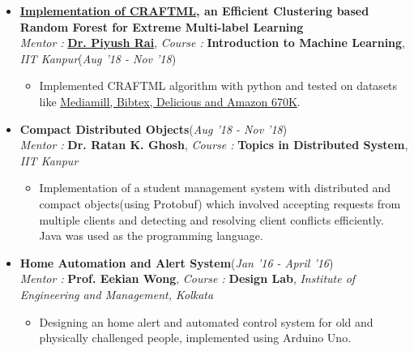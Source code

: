 \documentclass[10pt]{extarticle}
\begin{document}
\begin{itemize}
\item \textbf{ \href{https://github.com/NirjharRoy/CRAFTML}{Implementation of CRAFTML}, an Efficient Clustering based Random Forest for Extreme Multi-label Learning} \\
{\textit{Mentor : }}\textbf{\href{https://www.cse.iitk.ac.in/users/piyush/}{Dr. Piyush Rai}}, \textit{{Course : }}\textbf{Introduction to Machine Learning}, \textit{IIT Kanpur}\hfill\hfill(\textit{Aug '18 - Nov '18})
\begin{itemize}
\item Implemented CRAFTML algorithm with python and tested on datasets like \href{http://manikvarma.org/downloads/XC/XMLRepository.html}{Mediamill, Bibtex, Delicious and Amazon 670K}.

\end{itemize}






\item \textbf{Compact Distributed Objects}\hfill\hfill(\textit{Aug '18 - Nov '18})\\{\textit{Mentor : }}\textbf{{Dr. Ratan K. Ghosh}}, \textit{{Course : }}\textbf{Topics in Distributed System}, \textit{IIT Kanpur}
\begin{itemize}
\item Implementation of a student management system with distributed and compact objects(using Protobuf) which involved accepting requests from multiple clients and detecting and resolving client conflicts efficiently. Java was used as the programming language.
\end{itemize}







\item \textbf{Home Automation and Alert System}\hfill\hfill(\textit{Jan '16 - April '16})\\{\textit{Mentor : }}\textbf{{Prof. Eekian Wong}}, \textit{{Course : }}\textbf{Design Lab}, \textit{Institute of Engineering and Management, Kolkata}
\begin{itemize}
\item Designing an home alert and automated control system for old and physically challenged people, implemented using Arduino Uno.
\end{itemize}




\end{itemize}
\end{document}
